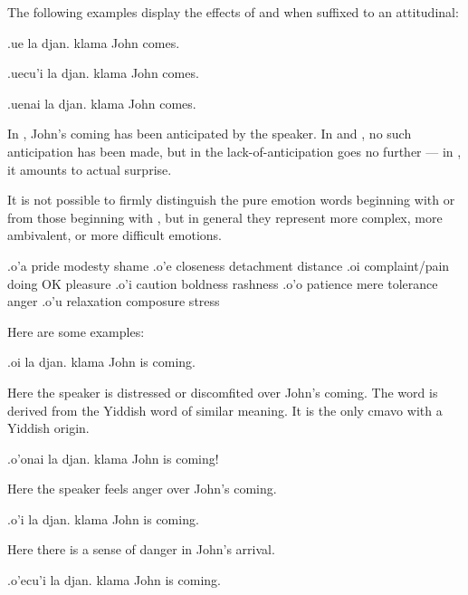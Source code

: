The following examples display the effects of  and
     when suffixed to an attitudinal:
\begin{example}
.ue la djan. klama\n
{} John comes.
\end{example}

\begin{example}
.uecu'i la djan. klama\n
{} John comes.
\end{example}

\begin{example}
.uenai la djan. klama\n
{} John comes.
\end{example}

In , John's coming has been
    anticipated by the speaker. In 
    and , no such anticipation has
    been made, but in  the
    lack-of-anticipation goes no further --- in , it amounts to actual
    surprise.

It is not possible to firmly distinguish the pure emotion
    words beginning with  or  from those beginning with
    , but in general they represent more complex, more
    ambivalent, or more difficult emotions.

   .o'a    pride       modesty     shame
    .o'e    closeness   detachment  distance
    .oi complaint/pain  doing OK    pleasure
    .o'i    caution     boldness    rashness
    .o'o    patience    mere tolerance  anger
    .o'u    relaxation  composure   stress

Here are some examples:
\begin{example}
.oi la djan. klama\n
{} John is coming.
\end{example}

Here the speaker is distressed or discomfited over John's
    coming. The word  is derived from the Yiddish word
     of similar meaning. It is the only cmavo with a Yiddish
    origin.
\begin{example}
.o'onai la djan. klama\n
{} John is coming!
\end{example}

Here the speaker feels anger over John's coming.
\begin{example}
.o'i la djan. klama\n
{} John is coming.
\end{example}

Here there is a sense of danger in John's arrival.
\begin{example}
.o'ecu'i la djan. klama\n
{} John is coming.
\end{example}

